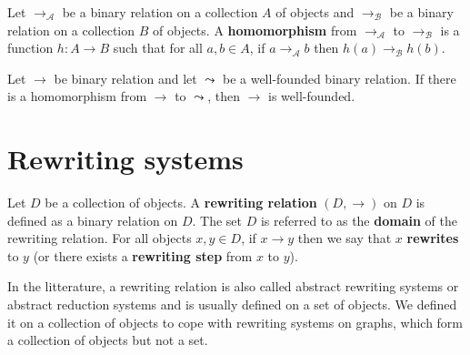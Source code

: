 \documentclass{book}
\begin{document}
  \begin{definition}
    \label{def:binary_relation:homomorphism}
    Let $\to_\mathcal{A}$ be a binary relation on a collection $A$ of objects and $\to_\mathcal{B}$ be a binary relation on a collection $B$ of objects. A \textbf{homomorphism} from $\to_\mathcal{A}$ to $\to_\mathcal{B}$ is a function \( h: A \to B \) such that for all \( a, b \in A \), if \( a \to_\mathcal{A} b \) then \( h(a) \to_\mathcal{B} h(b) \).
  \end{definition}
  
\begin{proposition}
  \label{prop:binary_relation:proving_well_foundedness}
  Let \(\to\) be binary relation and let $\leadsto$ be a well-founded binary relation. If there is a homomorphism from \(\to\) to \(\leadsto\), then \(\to\) is well-founded.
\end{proposition}
  

\chapter{Rewriting systems}
    \label{sec:category_of_rewriting_systems}      
      \begin{definition}
        \label{def:ars}
        Let $D$ be a collection of objects.  
        A \textbf{rewriting relation} $(D, \rightarrow)$ on $D$ is defined as a binary relation on $D$.  
        The set $D$ is referred to as the \textbf{domain} of the rewriting relation.  
        For all objects $x, y \in D$, if $x \rightarrow y$ then we say that $x$ \textbf{rewrites} to $y$ (or there exists a \textbf{rewriting step} from $x$ to $y$).
    \end{definition}

      In the litterature, a rewriting relation is also called abstract rewriting systems or abstract reduction systems \cite{nipkow1998term,terese2003term} and is usually defined on a set of objects. We defined it on a collection of objects to cope with rewriting systems on graphs, which form a collection of objects but not a set.
       
\end{document}
